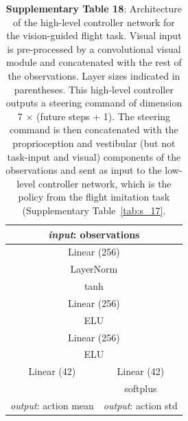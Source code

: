 \documentclass[sn-mathphys-num]{sn-jnl}%
\theoremstyle{thmstyleone}%
\theoremstyle{thmstyletwo}%
\theoremstyle{thmstylethree}%
\begin{document}
\begin{appendices}
\begin{table}[htbp]
	\centering
	\small
	\caption{\textbf{Supplementary Table 18}:
		Architecture of the high-level controller network for the vision-guided flight task. 
		Visual input is pre-processed by a convolutional visual module and concatenated with the rest of the observations. 
		Layer sizes indicated in parentheses. 
		This high-level controller outputs a steering command of dimension 7 $ \times $ (future steps + 1). 
		The steering command is then concatenated with the proprioception and vestibular (but not task-input and visual) components of the observations and sent as input to the low-level controller network, which is the policy from the flight imitation task (Supplementary Table~\ref{tab:s_17}.
	}
	\begin{tabular}{cc}
		\toprule
		\multicolumn{2}{c}{\textit{input}: observations}             \\
		\midrule
		\multicolumn{2}{c}{Linear (256)}        \\
		\multicolumn{2}{c}{LayerNorm}      \\
		\multicolumn{2}{c}{tanh}     \\
		\multicolumn{2}{c}{Linear (256)}      \\
		\multicolumn{2}{c}{ELU}       \\
		\multicolumn{2}{c}{Linear (256)}       \\
		\multicolumn{2}{c}{ELU}      \\
		\midrule
		Linear (42)     &  Linear (42)  \\
		&  softplus \\
		\textit{output}: action mean     &  \textit{output}: action std  \\
		\bottomrule
	\end{tabular}%
	\label{tab:s_18}%
\end{table}%




\end{appendices}
\end{document}
